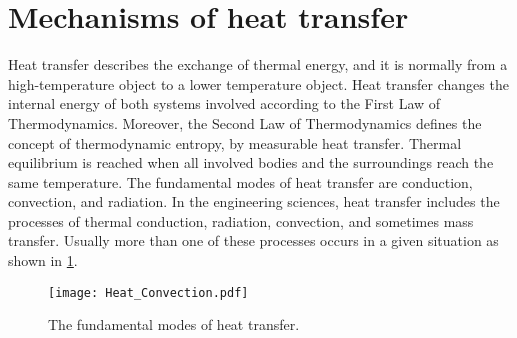 \section{Mechanisms of heat transfer}
\noindent
Heat transfer describes the exchange of thermal energy, and it is normally from a high-temperature object to a lower temperature object.
Heat transfer changes the internal energy of both systems involved according to the First Law of Thermodynamics.
Moreover, the Second Law of Thermodynamics defines the concept of thermodynamic entropy, by measurable heat transfer.
Thermal equilibrium is reached when all involved bodies and the surroundings reach the same temperature.
The fundamental modes of heat transfer are conduction, convection, and radiation.
In the engineering sciences, heat transfer includes the processes of thermal conduction, radiation, convection, and sometimes mass transfer.
Usually more than one of these processes occurs in a given situation as shown in \ref{Fig:HeatTransfer}.
\begin{figure}[!htp]
	\centering
	\texttt{[image: Heat\_Convection.pdf]}
	\caption{The fundamental modes of heat transfer.}
	\label{Fig:HeatTransfer}
\end{figure}

